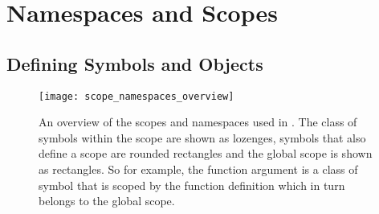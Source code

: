 \section{Namespaces and Scopes}
\label{sec:symbolScoping}

\subsection{Defining Symbols and Objects}

\begin{figure}
\texttt{[image: scope\_namespaces\_overview]}
\caption{An overview of the scopes and namespaces used in
  \pharmml. The class of symbols within the scope are shown as
  lozenges, symbols that also define a scope are rounded rectangles
  and the global scope is shown as rectangles. So for example, the
  function argument is a class of symbol that is scoped by the
  function definition which in turn belongs to the global scope.}
\label{fig:scopes-overview}
\end{figure}

